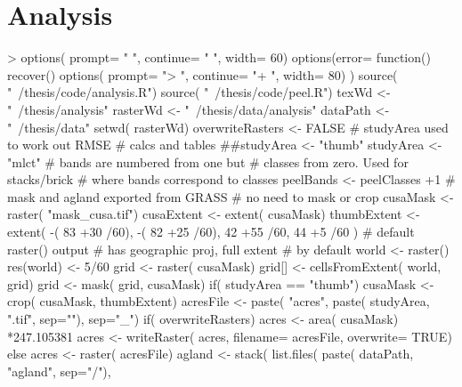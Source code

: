 







\graphicspath{ {analysis/} }

\chapter{Analysis}
\label{cha:analysis}


\begin{Schunk}
\begin{Sinput}
> options( prompt= " ", continue= " ", width= 60)
 options(error= function(){
   recover()
   options( prompt= "> ", continue= "+ ", width= 80)
 })
 source( "~/thesis/code/analysis.R")
 source( "~/thesis/code/peel.R")
 texWd <- "~/thesis/analysis"
 rasterWd <- "~/thesis/data/analysis"
 dataPath <- "~/thesis/data"
 setwd( rasterWd)
 overwriteRasters <- FALSE
                                         # studyArea used to work out RMSE
                                         # calcs and tables
 ##studyArea <- "thumb"
 studyArea <- "mlct"
                                         # bands are numbered from one but
                                         # classes from zero.  Used for stacks/brick
                                         # where bands correspond to classes
 peelBands <- peelClasses +1
                                         # mask and agland exported from GRASS
                                         # no need to mask or crop
 cusaMask <- raster( "mask_cusa.tif")
 cusaExtent <- extent( cusaMask)
 thumbExtent <- extent( -( 83 +30 /60), -( 82 +25 /60),
                           42 +55 /60,     44  +5 /60 )
                                         # default raster() output
                                         # has geographic proj, full extent
                                         # by default
 world <- raster()
 res(world) <- 5/60
 grid <- raster( cusaMask)
 grid[] <- cellsFromExtent( world, grid)
 grid <- mask( grid, cusaMask)
 if( studyArea == "thumb") {
   cusaMask <- crop( cusaMask, thumbExtent)
 }
 acresFile <- paste( "acres",
                    paste( studyArea, ".tif", sep=""),
                    sep="_")
 if( overwriteRasters) {
   acres <- area( cusaMask) *247.105381
   acres <- writeRaster( acres,
                        filename= acresFile,
                        overwrite= TRUE)
 } else acres <- raster( acresFile)
 agland <- stack( list.files( paste( dataPath, "agland", sep="/"),

\end{Sinput}
\end{Schunk}
